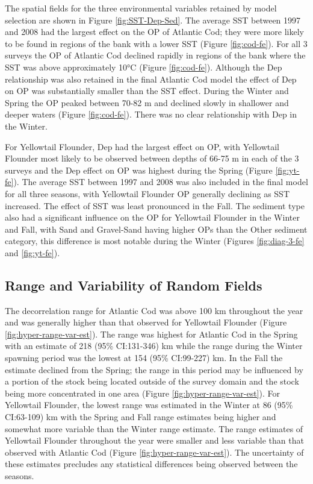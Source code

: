 \documentclass[
]{article}
\begin{document}
The spatial fields for the three environmental variables retained by model selection are shown in Figure \ref{fig:SST-Dep-Sed}. The average SST between 1997 and 2008 had the largest effect on the OP of Atlantic Cod; they were more likely to be found in regions of the bank with a lower SST (Figure \ref{fig:cod-fe}). For all 3 surveys the OP of Atlantic Cod declined rapidly in regions of the bank where the SST was above approximately 10°C (Figure \ref{fig:cod-fe}). Although the Dep relationship was also retained in the final Atlantic Cod model the effect of Dep on OP was substantially smaller than the SST effect. During the Winter and Spring the OP peaked between 70-82 m and declined slowly in shallower and deeper waters (Figure \ref{fig:cod-fe}). There was no clear relationship with Dep in the Winter.

For Yellowtail Flounder, Dep had the largest effect on OP, with Yellowtail Flounder most likely to be observed between depths of 66-75 m in each of the 3 surveys and the Dep effect on OP was highest during the Spring (Figure \ref{fig:yt-fe}). The average SST between 1997 and 2008 was also included in the final model for all three seasons, with Yellowtail Flounder OP generally declining as SST increased. The effect of SST was least pronounced in the Fall. The sediment type also had a significant influence on the OP for Yellowtail Flounder in the Winter and Fall, with Sand and Gravel-Sand having higher OPs than the Other sediment category, this difference is most notable during the Winter (Figures \ref{fig:diag-3-fe} and \ref{fig:yt-fe}).

\hypertarget{range-and-variability-of-random-fields}{%
\subsection{Range and Variability of Random Fields}\label{range-and-variability-of-random-fields}}

The decorrelation range for Atlantic Cod was above 100 km throughout the year and was generally higher than that observed for Yellowtail Flounder (Figure \ref{fig:hyper-range-var-est}). The range was highest for Atlantic Cod in the Spring with an estimate of 218 (95\% CI:131-346) km while the range during the Winter spawning period was the lowest at 154 (95\% CI:99-227) km. In the Fall the estimate declined from the Spring; the range in this period may be influenced by a portion of the stock being located outside of the survey domain and the stock being more concentrated in one area (Figure \ref{fig:hyper-range-var-est}). For Yellowtail Flounder, the lowest range was estimated in the Winter at 86 (95\% CI:63-109) km with the Spring and Fall range estimates being higher and somewhat more variable than the Winter range estimate. The range estimates of Yellowtail Flounder throughout the year were smaller and less variable than that observed with Atlantic Cod (Figure \ref{fig:hyper-range-var-est}). The uncertainty of these estimates precludes any statistical differences being observed between the seasons.
\end{document}
